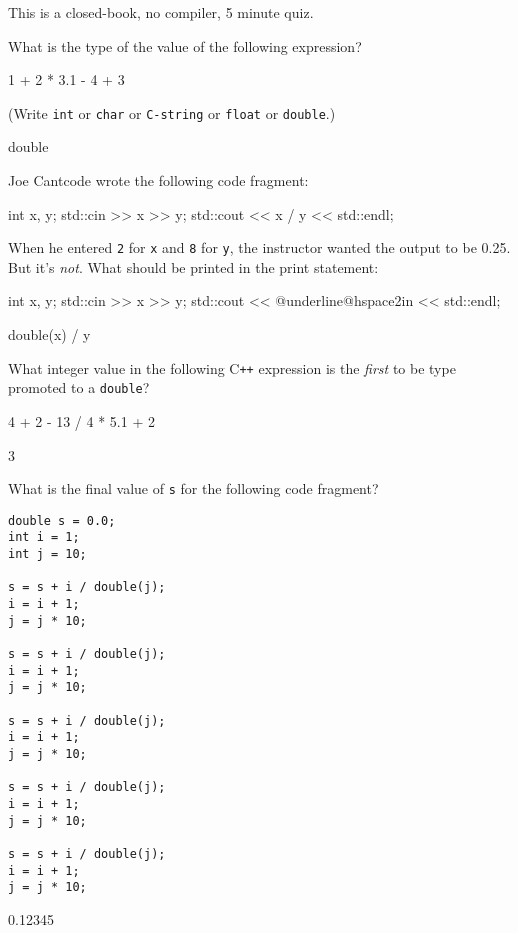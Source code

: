 

This is a closed-book, no compiler, 5 minute quiz.

\nextq
What is the type of the value of the following expression?
\begin{console}[fontsize=\small]
1 + 2 * 3.1 - 4 + 3
\end{console}
(Write \verb!int! or \verb!char! or \verb!C-string! or \verb!float! or
\verb!double!.)
\\
\ANSWER
\begin{answercode}
double
\end{answercode}

\nextq
Joe Cantcode wrote the following code fragment:
\begin{console}[commandchars=\@\{\},fontsize=\small]
int x, y;
std::cin >> x >> y;
std::cout << x / y << std::endl;
\end{console}
When he entered \verb!2! for \verb!x! and \verb!8! for \verb!y!,
the instructor wanted
the output to be 0.25.
But it's \textit{not}.
What should be printed in the print statement:
\begin{console}[commandchars=\@\{\},fontsize=\small]
int x, y;
std::cin >> x >> y;
std::cout << @underline{@hspace{2in}} << std::endl;
\end{console}
\ANSWER
\begin{answercode}
double(x) / y
\end{answercode}

\nextq
What integer value in the following
C\texttt{++}
expression is the \textit{first} to be type promoted to a \texttt{double}?
\begin{console}[commandchars=\\\{\},fontsize=\small]
4 + 2 - 13 / 4 * 5.1 + 2
\end{console}
\ANSWER
\begin{answercode}
3
\end{answercode}

\nextq
What is the final value of \verb!s! for the following code fragment?
\begin{Verbatim}[fontsize=\footnotesize,frame=single]
double s = 0.0;
int i = 1;
int j = 10;

s = s + i / double(j);
i = i + 1;
j = j * 10;

s = s + i / double(j);
i = i + 1;
j = j * 10;

s = s + i / double(j);
i = i + 1;
j = j * 10;

s = s + i / double(j);
i = i + 1;
j = j * 10;

s = s + i / double(j);
i = i + 1;
j = j * 10;
\end{Verbatim}
\ANSWER
\begin{answercode}
0.12345
\end{answercode}


